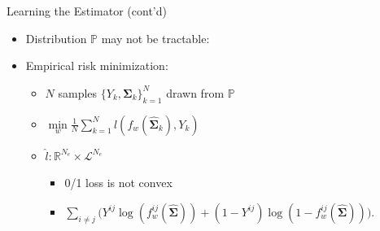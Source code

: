 \documentclass{beamer}
\begin{document}
\begin{frame}{Learning the Estimator (cont'd)}
  \begin{itemize}
  \item Distribution $\mathbb{P}$ may not be tractable:
  \item Empirical risk minimization:
    \begin{itemize}
      \item $N$ samples $\{Y_k,\mathbf{\Sigma}_k \}_{k=1}^N$ drawn
        from $\mathbb{P}$
      \item $\min\limits_{w} \frac{1}{N}\sum_{k=1}^N
        l(f_{w}(\mathbf{\hat{{\Sigma}}}_k),Y_k)$
      \item $\hat{l}: \mathbb{R}^{N_e} \times \mathcal{L}^{N_e}$
        \begin{itemize}
        \item 0/1 loss is not convex
        \item $\sum\limits_{i \neq j} \big( Y^{ij}\log (f_{w}^{ij}(\hat{\mathbf{\Sigma}}))+(1-Y^{ij})\log (1-f_{w}^{ij}(\hat{\mathbf{\Sigma}}))\big) .$
        \end{itemize}
    \end{itemize}
  \end{itemize}
\end{frame}
\end{document}
